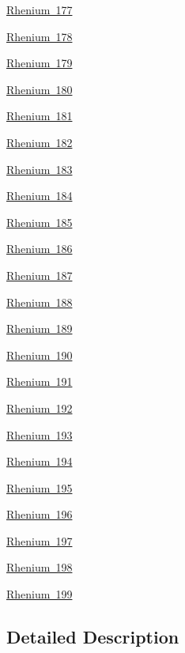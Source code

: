 \begin{DoxyCompactItemize}
\item 
\mbox{\hyperlink{group___isotope_const-_rhenium-_re177}{Rhenium 177}}
\item 
\mbox{\hyperlink{group___isotope_const-_rhenium-_re178}{Rhenium 178}}
\item 
\mbox{\hyperlink{group___isotope_const-_rhenium-_re179}{Rhenium 179}}
\item 
\mbox{\hyperlink{group___isotope_const-_rhenium-_re180}{Rhenium 180}}
\item 
\mbox{\hyperlink{group___isotope_const-_rhenium-_re181}{Rhenium 181}}
\item 
\mbox{\hyperlink{group___isotope_const-_rhenium-_re182}{Rhenium 182}}
\item 
\mbox{\hyperlink{group___isotope_const-_rhenium-_re183}{Rhenium 183}}
\item 
\mbox{\hyperlink{group___isotope_const-_rhenium-_re184}{Rhenium 184}}
\item 
\mbox{\hyperlink{group___isotope_const-_rhenium-_re185}{Rhenium 185}}
\item 
\mbox{\hyperlink{group___isotope_const-_rhenium-_re186}{Rhenium 186}}
\item 
\mbox{\hyperlink{group___isotope_const-_rhenium-_re187}{Rhenium 187}}
\item 
\mbox{\hyperlink{group___isotope_const-_rhenium-_re188}{Rhenium 188}}
\item 
\mbox{\hyperlink{group___isotope_const-_rhenium-_re189}{Rhenium 189}}
\item 
\mbox{\hyperlink{group___isotope_const-_rhenium-_re190}{Rhenium 190}}
\item 
\mbox{\hyperlink{group___isotope_const-_rhenium-_re191}{Rhenium 191}}
\item 
\mbox{\hyperlink{group___isotope_const-_rhenium-_re192}{Rhenium 192}}
\item 
\mbox{\hyperlink{group___isotope_const-_rhenium-_re193}{Rhenium 193}}
\item 
\mbox{\hyperlink{group___isotope_const-_rhenium-_re194}{Rhenium 194}}
\item 
\mbox{\hyperlink{group___isotope_const-_rhenium-_re195}{Rhenium 195}}
\item 
\mbox{\hyperlink{group___isotope_const-_rhenium-_re196}{Rhenium 196}}
\item 
\mbox{\hyperlink{group___isotope_const-_rhenium-_re197}{Rhenium 197}}
\item 
\mbox{\hyperlink{group___isotope_const-_rhenium-_re198}{Rhenium 198}}
\item 
\mbox{\hyperlink{group___isotope_const-_rhenium-_re199}{Rhenium 199}}
\end{DoxyCompactItemize}


\subsection{Detailed Description}
